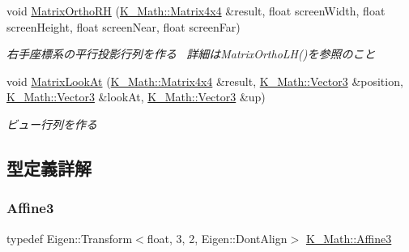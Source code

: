 \begin{DoxyCompactItemize}
void \mbox{\hyperlink{namespace_k___math_a817a68791367b9e515f7e096361ae1aa}{Matrix\+Ortho\+RH}} (\mbox{\hyperlink{namespace_k___math_a345271af9d32dff2c964bc679b13b45c}{K\+\_\+\+Math\+::\+Matrix4x4}} \&result, float screen\+Width, float screen\+Height, float screen\+Near, float screen\+Far)
\begin{DoxyCompactList}\small\item\em 右手座標系の平行投影行列を作る~\newline
詳細は\+Matrix\+Ortho\+L\+H()を参照のこと \end{DoxyCompactList}\item 
void \mbox{\hyperlink{namespace_k___math_a6b4f61bdcace7fe46cac98caa4db8931}{Matrix\+Look\+At}} (\mbox{\hyperlink{namespace_k___math_a345271af9d32dff2c964bc679b13b45c}{K\+\_\+\+Math\+::\+Matrix4x4}} \&result, \mbox{\hyperlink{namespace_k___math_a66884d78082c39ada4091c211f3570f8}{K\+\_\+\+Math\+::\+Vector3}} \&position, \mbox{\hyperlink{namespace_k___math_a66884d78082c39ada4091c211f3570f8}{K\+\_\+\+Math\+::\+Vector3}} \&look\+At, \mbox{\hyperlink{namespace_k___math_a66884d78082c39ada4091c211f3570f8}{K\+\_\+\+Math\+::\+Vector3}} \&up)
\begin{DoxyCompactList}\small\item\em ビュー行列を作る \end{DoxyCompactList}\end{DoxyCompactItemize}


\subsection{型定義詳解}
\mbox{\label{namespace_k___math_a1de8cd5bcdc049291da842729bf45aeb}} 
\subsubsection{\texorpdfstring{Affine3}{Affine3}}
{\footnotesize\ttfamily typedef Eigen\+::\+Transform$<$float, 3, 2, Eigen\+::\+Dont\+Align$>$ \mbox{\hyperlink{namespace_k___math_a1de8cd5bcdc049291da842729bf45aeb}{K\+\_\+\+Math\+::\+Affine3}}}

\mbox{\label{namespace_k___math_a0f5db7b05f161215069d86bce9dac011}} 
